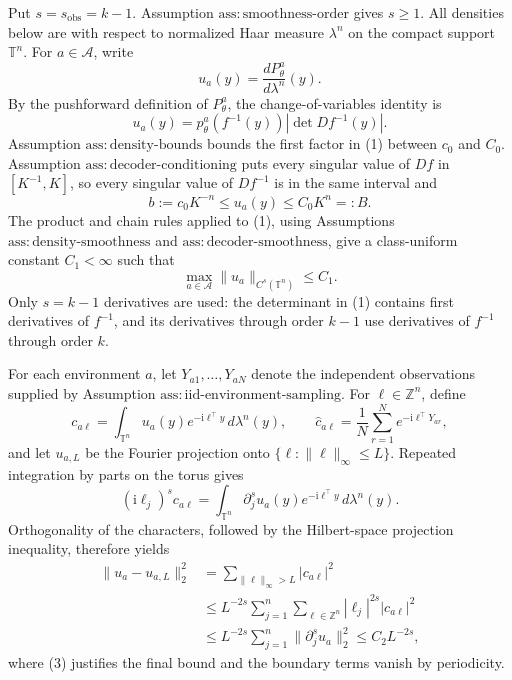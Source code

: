 Put \(s=s_{\mathrm{obs}}=k-1\).  Assumption \(\mathrm{ass:smoothness\text{-}order}\) gives \(s\geq 1\).  All densities below are with respect to normalized Haar measure \(\lambda^n\) on the compact support \(\mathbb T^n\).  For \(a\in\mathcal A\), write
\[
 u_a(y)=\frac{dP_\theta^a}{d\lambda^n}(y).
\]
By the pushforward definition of \(P_\theta^a\), the change-of-variables identity is
\[
 u_a(y)=p_\theta^a\!\left(f^{-1}(y)\right)
          \left|\det Df^{-1}(y)\right|.
\tag{1}
\]
Assumption \(\mathrm{ass:density\text{-}bounds}\) bounds the first factor in (1) between \(c_0\) and \(C_0\).  Assumption \(\mathrm{ass:decoder\text{-}conditioning}\) puts every singular value of \(Df\) in \([K^{-1},K]\), so every singular value of \(Df^{-1}\) is in the same interval and
\[
 b:=c_0K^{-n}\leq u_a(y)\leq C_0K^n=:B.
\tag{2}
\]
The product and chain rules applied to (1), using Assumptions \(\mathrm{ass:density\text{-}smoothness}\) and \(\mathrm{ass:decoder\text{-}smoothness}\), give a class-uniform constant \(C_1<\infty\) such that
\[
 \max_{a\in\mathcal A}\lVert u_a\rVert_{C^s(\mathbb T^n)}\leq C_1.
\tag{3}
\]
Only \(s=k-1\) derivatives are used: the determinant in (1) contains first derivatives of \(f^{-1}\), and its derivatives through order \(k-1\) use derivatives of \(f^{-1}\) through order \(k\).

For each environment \(a\), let \(Y_{a1},\ldots,Y_{aN}\) denote the independent observations supplied by Assumption \(\mathrm{ass:iid\text{-}environment\text{-}sampling}\).  For \(\ell\in\mathbb Z^n\), define
\[
 c_{a\ell}=\int_{\mathbb T^n}u_a(y)e^{-\mathrm i\ell^\top y}\,d\lambda^n(y),
 \qquad
 \widehat c_{a\ell}=\frac1N\sum_{r=1}^N e^{-\mathrm i\ell^\top Y_{ar}},
\]
and let \(u_{a,L}\) be the Fourier projection onto \(\{\ell:\lVert\ell\rVert_\infty\leq L\}\).  Repeated integration by parts on the torus gives
\[
 (\mathrm i\ell_j)^s c_{a\ell}
 =\int_{\mathbb T^n}\partial_j^s u_a(y)e^{-\mathrm i\ell^\top y}\,d\lambda^n(y).
\]
Orthogonality of the characters, followed by the Hilbert-space projection inequality, therefore yields
\[
\begin{aligned}
 \lVert u_a-u_{a,L}\rVert_2^2
 &=\sum_{\lVert\ell\rVert_\infty>L}|c_{a\ell}|^2\\
 &\leq L^{-2s}\sum_{j=1}^n
       \sum_{\ell\in\mathbb Z^n}|\ell_j|^{2s}|c_{a\ell}|^2\\
 &\leq L^{-2s}\sum_{j=1}^n\lVert\partial_j^s u_a\rVert_2^2
 \leq C_2L^{-2s},
\end{aligned}
\tag{4}
\]
where (3) justifies the final bound and the boundary terms vanish by periodicity.

